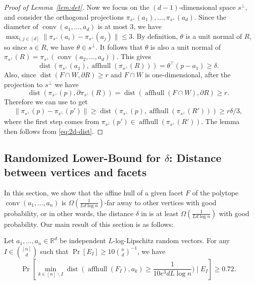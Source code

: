 \documentclass{theoretics}
\newcommand{\R}{\mathbb R}
\newcommand{\aff}{\operatorname{affhull}}
\newcommand{\conv}{\operatorname{conv}}
\newcommand{\dist}{\operatorname{dist}}
\begin{document}
\begin{proof}[Proof of Lemma~\ref{lem:det}]
Now we focus on the $(d-1)$-dimensional space $s^\perp$, and consider the orthogonal projections $\pi_{s^\perp}(a_1), \ldots, \pi_{s^\perp}(a_d)$.
Since the diameter of $\conv(a_1, \ldots, a_d)$ is at most $3$, we have $\max_{i, j \in [d]} \|\pi_{s^\perp}(a_i) - \pi_{s^\perp}(a_j)\| \leq 3$.
By definition, $\theta$ is a unit normal of $R$, so since $s \in R$, we have $\theta \in s^{\perp}$. It follows that $\theta$ is also a unit normal of $\pi_{s^\perp}(R) = \pi_{s^\perp}(\conv(a_2, \ldots, a_d))$. This gives
$$\dist(\pi_{s^\perp}(a_1), \aff(\pi_{s^\perp}(R))) = \theta^\top (p - a_1) \geq \delta.$$
Also, since $\dist(F \cap W, \partial R) \geq r$ and $F \cap W$ is one-dimensional, after the projection to $s^\perp$ we have
$$\dist(\pi_{s^\perp}(p), \partial \pi_{s^\perp}(R)) = \dist(\aff(F \cap W), \partial R) \geq r.$$
Therefore we can use  to get
\begin{align*}
    \|\pi_{s^\perp}(p) - \pi_{s^\perp}(p')\| \geq \dist(\pi_{s^\perp}(p), \aff(\pi_{s^\perp}(R'))) \geq r \delta /3,
\end{align*}
where the first step comes from $\pi_{s^\perp}(p') \in \aff(\pi_{s^\perp}(R'))$.
The lemma then follows from \eqref{eq:2d-dist}.
\end{proof}






\subsection{Randomized Lower-Bound for \texorpdfstring{$\delta$}{delta}: Distance between vertices and facets}\label{sub:rand-delta-lb}

In this section, we show that the affine hull of a given facet $F$ of the polytope
$\conv(a_1, \ldots, a_n)$ is $\Omega(\frac{1}{Ld\log n})$-far away to other
vertices with good probability, or in other words, the distance $\delta$ in
 is at least $\Omega(\frac{1}{Ld\log n})$ with good probability.
Our main result of this section is as follows:

\begin{lemma}\label{lem:rand-delta-lb}
    Let $a_1,\dots,a_n \in \R^d$ be independent $L$-log-Lipschitz random vectors.
    For any $I \in \binom{[n]}{d}$ such that $\Pr[E_I] \geq 10\binom{n}{d}^{-1}$, we have
    \[
        \Pr[\min_{k \in [n] \backslash I}\dist(\aff(F_I), a_k) \geq \frac{1}{10e^3 dL \log n}) \mid E_I] \geq 0.72.
    \]
\end{lemma}
\end{document}
